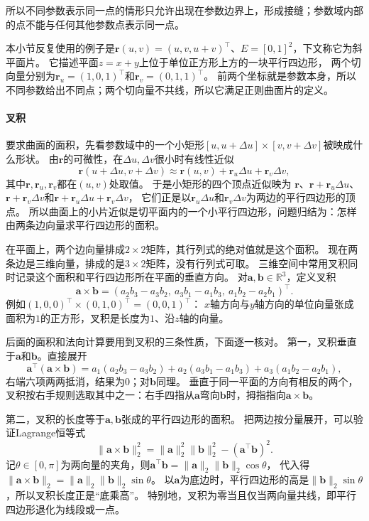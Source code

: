 所以不同参数表示同一点的情形只允许出现在参数边界上，形成接缝；参数域内部的点不能与任何其他参数点表示同一点。

本小节反复使用的例子是$\bm r(u,v)=(u,v,u+v)^\top$、$E=[0,1]^2$，下文称它为斜平面片。
它描述平面$z=x+y$上位于单位正方形上方的一块平行四边形，
两个切向量分别为$\bm r_u=(1,0,1)^\top$和$\bm r_v=(0,1,1)^\top$。
前两个坐标就是参数本身，所以不同参数给出不同点；两个切向量不共线，所以它满足正则曲面片的定义。

\paragraph{叉积}

要求曲面的面积，先看参数域中的一个小矩形$[u,u+\Delta u]\times[v,v+\Delta v]$被映成什么形状。
由$\bm r$的可微性，在$\Delta u,\Delta v$很小时有线性近似
\[
 \bm r(u+\Delta u,v+\Delta v)\approx\bm r(u,v)+\bm r_u\Delta u+\bm r_v\Delta v,
\]
其中$\bm r,\bm r_u,\bm r_v$都在$(u,v)$处取值。
于是小矩形的四个顶点近似映为
$\bm r$、$\bm r+\bm r_u\Delta u$、$\bm r+\bm r_v\Delta v$和$\bm r+\bm r_u\Delta u+\bm r_v\Delta v$，
它们正是以$\bm r_u\Delta u$和$\bm r_v\Delta v$为两边的平行四边形的顶点。
所以曲面上的小片近似是切平面内的一个小平行四边形，问题归结为：怎样由两条边向量求平行四边形的面积。

在平面上，两个边向量排成$2\times2$矩阵，其行列式的绝对值就是这个面积。
现在两条边是三维向量，排成的是$3\times2$矩阵，没有行列式可取。
三维空间中常用叉积同时记录这个面积和平行四边形所在平面的垂直方向。
对$\bm a,\bm b\in\mathbb R^3$，定义叉积
\[
 \bm a\times\bm b
 =(a_2b_3-a_3b_2,\ a_3b_1-a_1b_3,\ a_1b_2-a_2b_1)^\top.
\]
例如$(1,0,0)^\top\times(0,1,0)^\top=(0,0,1)^\top$：
$x$轴方向与$y$轴方向的单位向量张成面积为$1$的正方形，叉积是长度为$1$、沿$z$轴的向量。

后面的面积和法向计算要用到叉积的三条性质，下面逐一核对。
第一，叉积垂直于$\bm a$和$\bm b$。直接展开
\[
 \bm a^\top(\bm a\times\bm b)
 =a_1(a_2b_3-a_3b_2)+a_2(a_3b_1-a_1b_3)+a_3(a_1b_2-a_2b_1),
\]
右端六项两两抵消，结果为$0$；对$\bm b$同理。
垂直于同一平面的方向有相反的两个，叉积按右手规则选取其中之一：右手四指从$\bm a$弯向$\bm b$时，拇指指向$\bm a\times\bm b$。

第二，叉积的长度等于$\bm a,\bm b$张成的平行四边形的面积。
把两边按分量展开，可以验证Lagrange恒等式
\[
 \lVert\bm a\times\bm b\rVert_2^2
 =\lVert\bm a\rVert_2^2\lVert\bm b\rVert_2^2-(\bm a^\top\bm b)^2.
\]
记$\theta\in[0,\pi]$为两向量的夹角，则$\bm a^\top\bm b=\lVert\bm a\rVert_2\lVert\bm b\rVert_2\cos\theta$，
代入得$\lVert\bm a\times\bm b\rVert_2=\lVert\bm a\rVert_2\lVert\bm b\rVert_2\sin\theta$。
以$\bm a$为底边时，平行四边形的高是$\lVert\bm b\rVert_2\sin\theta$，所以叉积长度正是“底乘高”。
特别地，叉积为零当且仅当两向量共线，即平行四边形退化为线段或一点。

